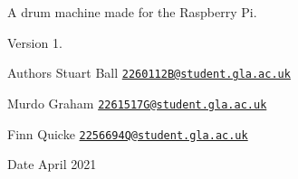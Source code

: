 A drum machine made for the Raspberry Pi. \begin{DoxyVersion}{Version}
1. 
\end{DoxyVersion}
\begin{DoxyAuthor}{Authors}
Stuart Ball \href{mailto:2260112B@student.gla.ac.uk}{\tt 2260112\+B@student.\+gla.\+ac.\+uk} 

Murdo Graham \href{mailto:2261517G@student.gla.ac.uk}{\tt 2261517\+G@student.\+gla.\+ac.\+uk} 

Finn Quicke \href{mailto:2256694Q@student.gla.ac.uk}{\tt 2256694\+Q@student.\+gla.\+ac.\+uk} 
\end{DoxyAuthor}
\begin{DoxyDate}{Date}
April 2021 
\end{DoxyDate}
